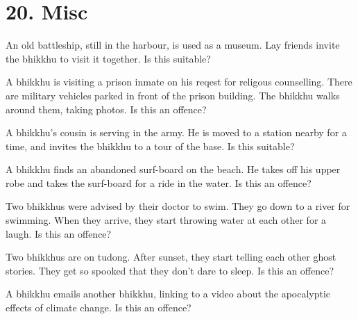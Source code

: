 \chapter{20. Misc}
\renewcommand*{\theChapterTitle}{20. Misc}

An old battleship, still in the harbour, is used as a museum. Lay friends invite
the bhikkhu to visit it together. Is this suitable?

\bigskip

A bhikkhu is visiting a prison inmate on his reqest for religous counselling.
There are military vehicles parked in front of the prison building. The bhikkhu
walks around them, taking photos. Is this an offence?

\bigskip

A bhikkhu's cousin is serving in the army. He is moved to a station nearby for a
time, and invites the bhikkhu to a tour of the base. Is this suitable?

\bigskip

A bhikkhu finds an abandoned surf-board on the beach. He takes off his upper
robe and takes the surf-board for a ride in the water. Is this an offence?

\bigskip

Two bhikkhus were advised by their doctor to swim. They go down to a river for
swimming. When they arrive, they start throwing water at each other for a laugh.
Is this an offence?

\bigskip

Two bhikkhus are on tudong. After sunset, they start telling each other ghost
stories. They get so spooked that they don't dare to sleep. Is this an offence?

\bigskip

A bhikkhu emails another bhikkhu, linking to a video about the apocalyptic
effects of climate change. Is this an offence?

